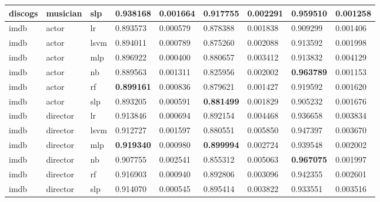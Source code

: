 \documentclass[epsfig,a4paper,11pt,titlepage,twoside,openany]{book}
\begin{document}
\begin{longtable}{|l|l|l|l|l|l|l|l|l|}
discogs     & musician & slp   & 0.938168                           & 0.001664 & 0.917755                           & 0.002291 & 0.959510                           & 0.001258 \\ \hline
imdb        & actor    & lr    & 0.893573                           & 0.000579 & 0.878388                           & 0.001838 & 0.909299                           & 0.001406 \\
imdb        & actor    & lsvm  & 0.894011                           & 0.000789 & 0.875260                           & 0.002088 & 0.913592                           & 0.001998 \\
imdb        & actor    & mlp   & 0.896922                           & 0.000400 & 0.880657                           & 0.003412 & 0.913832                           & 0.004129 \\
imdb        & actor    & nb    & 0.889563                           & 0.001311 & 0.825956                           & 0.002002 & \textbf{0.963789} & 0.001153 \\
imdb        & actor    & rf    & \textbf{0.899161} & 0.000836 & 0.879621                           & 0.001427 & 0.919592                           & 0.001620 \\
imdb        & actor    & slp   & 0.893205                           & 0.000591 & \textbf{0.881499} & 0.001829 & 0.905232                           & 0.001676 \\ \hline
imdb        & director & lr    & 0.913846                           & 0.000694 & 0.892154                           & 0.004468 & 0.936658                           & 0.003834 \\
imdb        & director & lsvm  & 0.912727                           & 0.001597 & 0.880551                           & 0.005850 & 0.947397                           & 0.003670 \\
imdb        & director & mlp   & \textbf{0.919340} & 0.000980 & \textbf{0.899994} & 0.002724 & 0.939548                           & 0.002002 \\
imdb        & director & nb    & 0.907755                           & 0.002541 & 0.855312                           & 0.005063 & \textbf{0.967075} & 0.001997 \\
imdb        & director & rf    & 0.916903                           & 0.000940 & 0.892806                           & 0.003096 & 0.942355                           & 0.002601 \\
imdb        & director & slp   & 0.914070                           & 0.000545 & 0.895414                           & 0.003822 & 0.933551                           & 0.003516 \\ \hline

\end{longtable}
\end{document}
